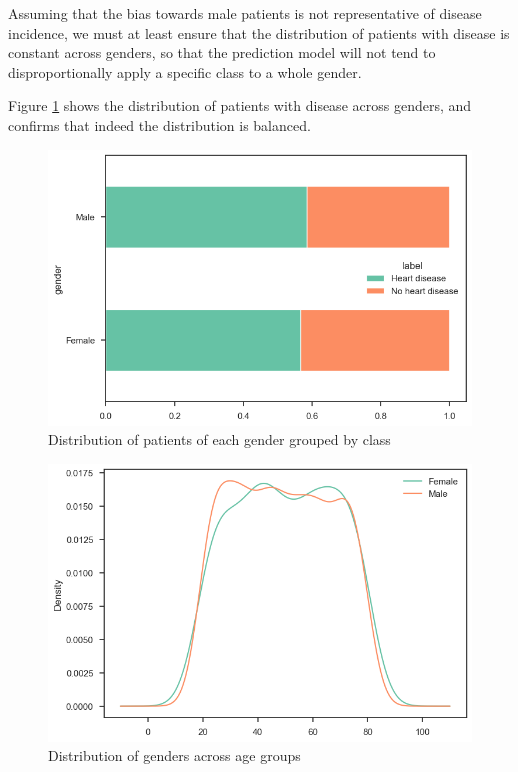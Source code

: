 Assuming that the bias towards male patients is not representative of disease incidence, we must at least
ensure that the distribution of patients with disease is constant across genders, so that the prediction
model will not tend to disproportionally apply a specific class to a whole gender.

Figure \ref{demographics-gender-target-percent} shows the distribution of patients with disease across genders,
and confirms that indeed the distribution is balanced.

\begin{figure}
    \caption{Distribution of patients of each gender grouped by class}\label{demographics-gender-target-percent}
    \centering
    \includegraphics[width=\linewidth]{media/demographics-04-gender-target-percentage.png}
\end{figure}


\begin{figure}
    \caption{Distribution of genders across age groups}\label{demographics-gender-agegroup-count}
    \centering
    \includegraphics[width=\linewidth]{media/demographics-02-gender-age.png}
\end{figure}

